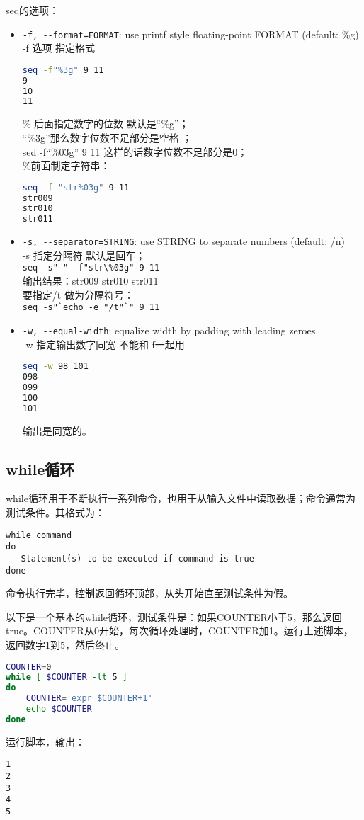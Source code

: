 seq的选项：
\begin{itemize}
\item \verb|-f, --format=FORMAT|: use printf style floating-point FORMAT (default: \%g)\\
-f 选项   指定格式
\begin{lstlisting}[language=sh]
seq -f"%3g" 9 11
9
10
11
\end{lstlisting}
\% 后面指定数字的位数 默认是“\%g”；\\
“\%3g”那么数字位数不足部分是空格 ；\\
sed -f“\%03g” 9 11 这样的话数字位数不足部分是0；\\
\%前面制定字符串：
\begin{lstlisting}[language=sh]
seq -f "str%03g" 9 11
str009
str010
str011
\end{lstlisting}
\item \verb|-s, --separator=STRING|: use STRING to separate numbers (default: /n)\\
-s 指定分隔符 默认是回车；\\
\verb|seq -s" " -f"str\%03g" 9 11|\\
输出结果：str009 str010 str011\\
要指定/t 做为分隔符号：\\
\verb|seq -s"`echo -e "/t"`" 9 11|

\item \verb|-w, --equal-width|:  equalize width by padding with leading zeroes\\
-w 指定输出数字同宽   不能和-f一起用 \\
\begin{lstlisting}[language=sh]
seq -w 98 101
098
099
100
101
\end{lstlisting}
输出是同宽的。
\end{itemize}




\subsection{while循环}
while循环用于不断执行一系列命令，也用于从输入文件中读取数据；命令通常为测试条件。其格式为：
\begin{verbatim}
while command
do
   Statement(s) to be executed if command is true
done
\end{verbatim}
命令执行完毕，控制返回循环顶部，从头开始直至测试条件为假。

以下是一个基本的while循环，测试条件是：如果COUNTER小于5，那么返回 true。COUNTER从0开始，每次循环处理时，COUNTER加1。运行上述脚本，返回数字1到5，然后终止。
\begin{lstlisting}[language=sh]
COUNTER=0
while [ $COUNTER -lt 5 ]
do
    COUNTER='expr $COUNTER+1'
    echo $COUNTER
done
\end{lstlisting}
运行脚本，输出：
\begin{verbatim}
1
2
3
4
5
\end{verbatim}

